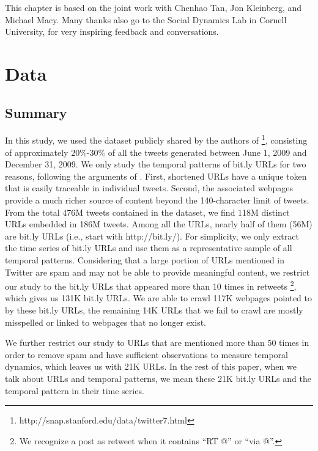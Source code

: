 \documentclass[phd,tocprelim]{cornell}
\begin{document}
This chapter is based on the joint work\cite{Wu-ICWSM-2011} with Chenhao Tan, Jon Kleinberg, and Michael Macy. Many thanks also go to the Social Dynamics Lab in Cornell University, for very inspiring feedback and conversations.

\section{Data}

\subsection{Summary}
In this study, we used the dataset publicly shared by the authors of \cite{Yang-2011}\footnote{http://snap.stanford.edu/data/twitter7.html}, 
consisting of approximately $20\%$-$30\%$ of all the tweets generated between June 1, 2009 and December 31, 2009. 
We only study the temporal patterns of bit.ly URLs for two reasons, 
following the arguments of \cite{Wu-Twitter-2011}. First, 
shortened URLs have a unique token that is easily traceable in individual tweets. 
Second, the associated webpages provide a much richer source of content beyond the 140-character limit of tweets. 
From the total 476M tweets contained in the dataset, we find 118M distinct URLs embedded in 186M tweets. 
Among all the URLs, nearly half of them (56M) are bit.ly URLs (i.e., start with http://bit.ly/). 
For simplicity, we only extract the time series of bit.ly URLs and use them as a representative sample of all temporal patterns. 
Considering that a large portion of URLs mentioned in Twitter are spam and may not be able to provide meaningful content, 
we restrict our study to the bit.ly URLs that appeared more than 10 times in retweets \footnote{We recognize a post as retweet when it contains ``RT @'' or ``via @''.}, 
which gives us 131K bit.ly URLs. 
We are able to crawl 117K webpages pointed to by these bit.ly URLs, the remaining 14K URLs that we fail to crawl are mostly misspelled 
or linked to webpages that no longer exist. 

We further restrict our study to URLs that are mentioned more than 50 times in order to remove spam and have sufficient observations to measure temporal dynamics, which leaves us with 21K URLs. 
In the rest of this paper, when we talk about URLs and temporal patterns, we mean these 21K bit.ly URLs and the temporal pattern in their time series.
\end{document}
